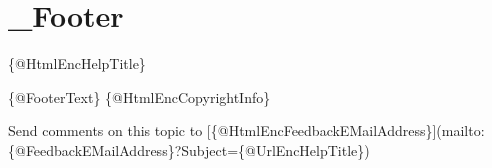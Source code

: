 \chapter{\+\_\+\+Footer}
\hypertarget{md_packages_2_e_w_software_8_s_h_f_b_82024_82_818_2tools_2_components_2_markdown_2_markdown_content_2___footer}{}\label{md_packages_2_e_w_software_8_s_h_f_b_82024_82_818_2tools_2_components_2_markdown_2_markdown_content_2___footer}
\{@\+Html\+Enc\+Help\+Title\}

\{@\+Footer\+Text\} \{@\+Html\+Enc\+Copyright\+Info\}

Send comments on this topic to \mbox{[}\{@\+Html\+Enc\+Feedback\+EMail\+Address\}\mbox{]}(mailto\+:\{@\+Feedback\+EMail\+Address\}?Subject=\{@\+Url\+Enc\+Help\+Title\}) 